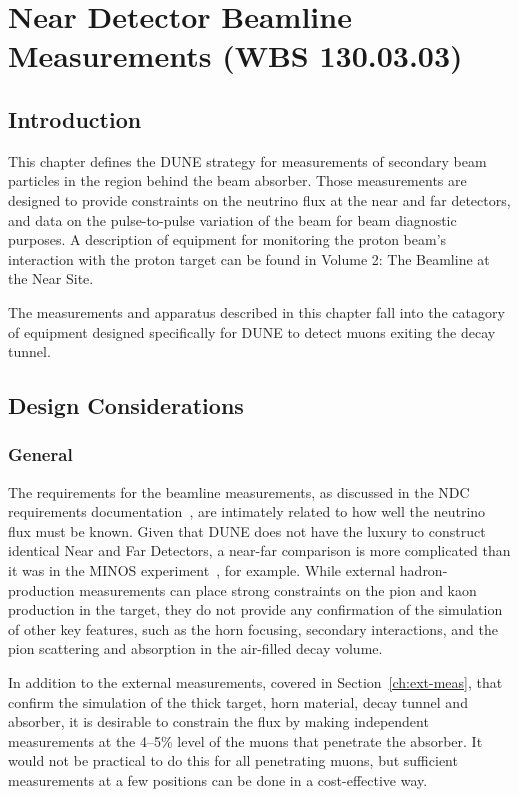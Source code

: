 \chapter{Near Detector Beamline Measurements (WBS 130.03.03)}
\label{ch:blm}


\section{Introduction}

This chapter defines the DUNE strategy for measurements of secondary
beam particles in the region behind the beam absorber. 
Those measurements are designed to provide constraints 
on the neutrino flux at the near and far
detectors, and data on the pulse-to-pulse variation
of the beam for beam diagnostic purposes. A description of equipment
for monitoring the proton beam's interaction with the proton target
can be found in Volume 2: The Beamline at the Near Site. 

The measurements and apparatus described in this chapter fall into
the catagory of equipment designed specifically for DUNE to
detect muons exiting the decay tunnel. 

\section{Design Considerations}
\label{v3ch3-design-consid}

\subsection{General}
The requirements for the beamline measurements, 
as discussed in the NDC requirements documentation~\cite{nd_requirements_doc}, are intimately related to how well the neutrino flux must be known.
Given that DUNE does not have the luxury to construct identical Near and Far Detectors, 
a near-far comparison is more complicated than it was in
the MINOS experiment~\cite{gnumi-validation}, for example.   
While external hadron-production measurements can place strong constraints on the pion and kaon production in the target,
they do not provide any confirmation of the simulation of other key features, such as the horn focusing, secondary interactions, and the pion scattering and absorption in the air-filled decay volume. 

In addition to the external measurements, covered in Section~\ref{ch:ext-meas}, 
that confirm
the simulation of the thick target, horn material, decay tunnel and
absorber, it is desirable to constrain the flux by making independent
measurements at the 4--5\%
level of the muons that penetrate the absorber. It would not be practical to do this for all penetrating
muons, but sufficient measurements at a few positions can be done in a 
cost-effective way. 

